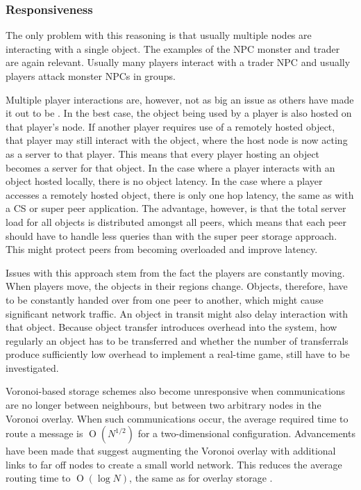 \documentclass[10pt,a4paper,journal,cspaper,compsoc]{IEEEtran}
\providecommand{\OO}[1]{\operatorname{O}\left(#1\right)}
\begin{document}
\subsubsection{Responsiveness}

The only problem with this reasoning is that usually multiple nodes are interacting with a single object. The examples of the NPC monster and trader
are again relevant. Usually many players interact with a trader NPC and usually players attack monster NPCs in groups.

Multiple player interactions are, however, not as big an issue as others have made it out to be \cite{Fan_deisgn_issues_p2p}. In the best case, the
object being used by a player is also hosted on that player's node. If another player requires use of a remotely hosted object, that player may still
interact with the object, where the host node is now acting as a server to that player. This means that every player hosting an object becomes a
server for that object. In the case where a player interacts with an object hosted locally, there is no object latency. In the case where a player
accesses a remotely hosted object, there is only one hop latency, the same as with a \ac{CS} or super peer application. The advantage, however, is
that the total server load for all objects is distributed amongst all peers, which means that each peer should have to handle less queries than with
the super peer storage approach. This might protect peers from becoming overloaded and improve latency.

Issues with this approach stem from the fact the players are constantly moving. When players move, the objects in their regions change. Objects,
therefore, have to be constantly handed over from one peer to another, which might cause significant network traffic. An object in transit might also
delay interaction with that object. Because object transfer introduces overhead into the system, how regularly an object has to be transferred and
whether the number of transferrals produce sufficiently low overhead to implement a real-time game, still have to be investigated.

Voronoi-based storage schemes also become unresponsive when communications are no longer between neighbours, but between two arbitrary nodes in the
Voronoi overlay. When such communications occur, the average required time to route a message is $\OO{N^{1/2}}$ for a two-dimensional configuration.
Advancements have been made that suggest augmenting the Voronoi overlay with additional links to far off nodes to create a small world network. This
reduces the average routing time to $\OO{\log{N}}$, the same as for overlay storage \cite{Steiner_voronoi_shortcuts}.
\end{document}
